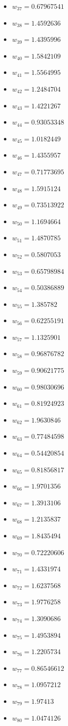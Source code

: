\documentclass[11pt]{article}
\begin{document}
\begin{itemize}
\item $w_{37} = 0.67967541$
\item $w_{38} = 1.4592636$
\item $w_{39} = 1.4395996$
\item $w_{40} = 1.5842109$
\item $w_{41} = 1.5564995$
\item $w_{42} = 1.2484704$
\item $w_{43} = 1.4221267$
\item $w_{44} = 0.93053348$
\item $w_{45} = 1.0182449$
\item $w_{46} = 1.4355957$
\item $w_{47} = 0.71773695$
\item $w_{48} = 1.5915124$
\item $w_{49} = 0.73513922$
\item $w_{50} = 1.1694664$
\item $w_{51} = 1.4870785$
\item $w_{52} = 0.5807053$
\item $w_{53} = 0.65798984$
\item $w_{54} = 0.50386889$
\item $w_{55} = 1.385782$
\item $w_{56} = 0.62255191$
\item $w_{57} = 1.1325901$
\item $w_{58} = 0.96876782$
\item $w_{59} = 0.90621775$
\item $w_{60} = 0.98030696$
\item $w_{61} = 0.81924923$
\item $w_{62} = 1.9630846$
\item $w_{63} = 0.77484598$
\item $w_{64} = 0.54420854$
\item $w_{65} = 0.81856817$
\item $w_{66} = 1.9701356$
\item $w_{67} = 1.3913106$
\item $w_{68} = 1.2135837$
\item $w_{69} = 1.8435494$
\item $w_{70} = 0.72220606$
\item $w_{71} = 1.4331974$
\item $w_{72} = 1.6237568$
\item $w_{73} = 1.9776258$
\item $w_{74} = 1.3090686$
\item $w_{75} = 1.4953894$
\item $w_{76} = 1.2205734$
\item $w_{77} = 0.86546612$
\item $w_{78} = 1.0957212$
\item $w_{79} = 1.97413$
\item $w_{80} = 1.0474126$
\end{itemize}
\end{document}
